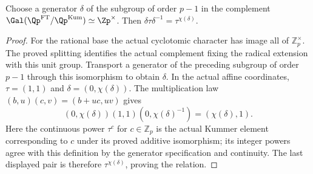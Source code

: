 \begin{definition}
\label{ft:delta}
\leanok
{}
Choose a generator $\delta$ of the subgroup of order $p-1$ in the complement
$\Gal(\Qp^{\mathrm{FT}}/\Qp^{\mathrm{Kum}})\simeq\Zp^\times$.
Then $\delta\tau\delta^{-1}=\tau^{\chi(\delta)}$.
\end{definition}
\begin{proof}
For the rational base the actual cyclotomic character has image all of
$\mathbb Z_p^\times$. The proved splitting identifies the actual
complement fixing the radical extension with this unit group. Transport
a generator of the preceding subgroup of order $p-1$ through this
isomorphism to obtain $\delta$. In the actual affine coordinates,
$\tau=(1,1)$ and $\delta=(0,\chi(\delta))$. The multiplication law
$(b,u)(c,v)=(b+uc,uv)$ gives
\[
 (0,\chi(\delta))(1,1)(0,\chi(\delta)^{-1})
 =(\chi(\delta),1).
\]
Here the continuous power $\tau^c$ for $c\in\mathbb Z_p$ is the
actual Kummer element corresponding to $c$ under its proved additive
isomorphism; its integer powers agree with this definition by the
generator specification and continuity. The last displayed pair is
therefore $\tau^{\chi(\delta)}$, proving the relation.
\end{proof}


